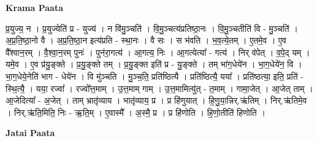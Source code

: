 \documentclass[17pt]{extarticle}
\begin{document}
\textbf{Krama Paata} \newline

प्र॒युज्य॒ न । प्र॒युज्येति॑ प्र - युज्य॑ । न वि॑मु॒ञ्चति॑ । वि॒मु॒ञ्चत्य॑प्रतिष्ठा॒नः । वि॒मु॒ञ्चतीति॑ वि - मु॒ञ्चति॑ । अ॒प्र॒ति॒ष्ठा॒नो वै । अ॒प्र॒ति॒ष्ठा॒न इत्य॑प्रति - स्था॒नः । वै सः । स भ॑वति । भ॒व॒त्ये॒तम् । ए॒तमे॒व । ए॒व वै᳚श्वान॒रम् । वै॒श्वा॒न॒रम् पुनः॑ । पुन॑रा॒गत्य॑ । आ॒गत्य॒ निः । आ॒गत्येत्या᳚ - गत्य॑ । निर् व॑पेत् । व॒पे॒द् यम् । यमे॒व । ए॒व प्र॑यु॒ङ्क्ते । प्र॒यु॒ङ्क्ते तम् । प्र॒यु॒ङ्क्त इति॑ प्र - यु॒ङ्क्ते । तम् भा॑ग॒धेये॑न । भा॒ग॒धेये॑न॒ वि । भा॒ग॒धेये॒नेति॑ भाग - धेये॑न । वि मु॑ञ्चति । मु॒ञ्च॒ति॒ प्रति॑ष्ठित्यै । प्रति॑ष्ठित्यै॒ यया᳚ । प्रति॑ष्ठत्या॒ इति॒ प्रति॑ - स्थि॒त्यै॒ । यया॒ रज्वा᳚ । रज्वो᳚त्त॒माम् । उ॒त्त॒माम् गाम् । उ॒त्त॒मामित्यु॑त् - त॒माम् । गामा॒जेत् । आ॒जेत् ताम् । आ॒जेदित्या᳚ - अ॒जेत् । ताम् भ्रातृ॑व्याय । भातृ॑व्याय॒ प्र । प्र हि॑णुयात् । हि॒णु॒या॒न्निर्.ऋ॑तिम् । निर्.ऋ॑तिमे॒व । निर्.ऋ॑ति॒मिति॒ निः - ऋ॒ति॒म् । ए॒वास्मै᳚ । अ॒स्मै॒ प्र । प्र हि॑णोति । हि॒णो॒तीति॑ हिणोति । \newline

\textbf{Jatai Paata} \newline
\end{document}

